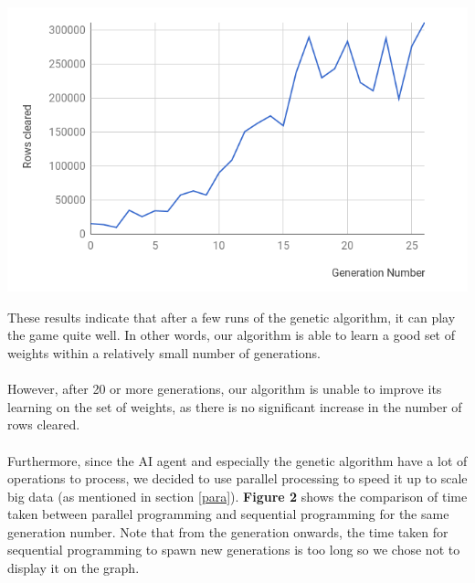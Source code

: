 \documentclass{article} %
\begin{document}
\begin{multicols}{2}
\begin{center}
\begin{minipage}{1.0\linewidth}
\includegraphics[width=\linewidth]{best_fit.png}
\end{minipage}
\end{center}

\noindent
These results indicate that after a few runs of the genetic algorithm, it can play the game quite well. In other words, our algorithm is able to learn a good set of weights within a relatively small number of generations. \\ \\
However, after 20 or more generations, our algorithm is unable to improve its learning on the set of weights, as there is no significant increase in the number of rows cleared. \\ \\
Furthermore, since the AI agent and especially the genetic algorithm have a lot of operations to process, we decided to use parallel processing to speed it up to scale big data (as mentioned in section \ref{para}). \textbf{Figure 2} shows the comparison of time taken between parallel programming and sequential programming for the same generation number. Note that from the  generation onwards, the time taken for sequential programming to spawn new generations is too long so we chose not to display it on the graph.


\end{multicols}
\end{document}
